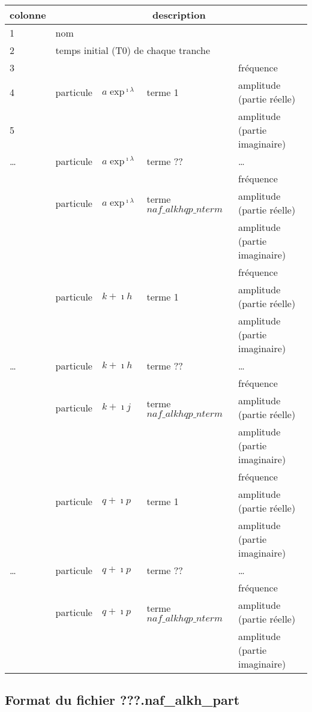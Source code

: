 \documentclass[11pt]{article}
\begin{document}
\begin{tabularx}{\textwidth}{|l|l|l|l|X|}
 \hline
 colonne &      \multicolumn{4}{c|}{description} \\ \hline
1  &    \multicolumn{4}{l|}{nom} \\ \hline
2  &    \multicolumn{4}{l|}{temps initial (T0) de chaque tranche} \\ \hline
3 & &   & & fr\'equence\\
4 &particule  &$a\exp^{\imath\lambda}$& terme 1 & amplitude (partie r\'eelle)\\
5 & &   & &amplitude (partie imaginaire)\\ \hline
\dots &particule  &$a\exp^{\imath\lambda}$& terme ?? &\dots \\ \hline
 & &   & &fr\'equence\\
 &particule  & $a\exp^{\imath\lambda}$ & terme $naf\_alkhqp\_nterm$ & amplitude (partie r\'eelle)\\
 & &   & &amplitude (partie imaginaire)\\ \hline
 & &   & & fr\'equence\\
 &particule  &$k+\imath h$& terme 1 & amplitude (partie r\'eelle)\\
 & &   & &amplitude (partie imaginaire)\\ \hline
\dots &particule  &$k+\imath h$& terme ?? &\dots \\ \hline
 & &   & &fr\'equence\\
 &particule  & $k+\imath j$ & terme $naf\_alkhqp\_nterm$ & amplitude (partie r\'eelle)\\
 & &   & &amplitude (partie imaginaire)\\ \hline
& &   & & fr\'equence\\
 &particule  &$q+\imath p$& terme 1 & amplitude (partie r\'eelle)\\
 & &   & &amplitude (partie imaginaire)\\ \hline
\dots &particule &$q+\imath p$& terme ?? &\dots \\ \hline
 & &   & &fr\'equence\\
 &particule & $q+\imath p$ & terme $naf\_alkhqp\_nterm$ & amplitude (partie r\'eelle)\\
 & &   & &amplitude (partie imaginaire)\\ \hline
\end{tabularx}



\subsection{Format du fichier {\bf ???.naf\_alkh\_part} }
\end{document}
